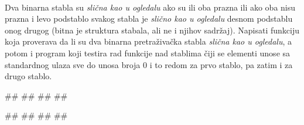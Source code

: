 \begin{Answer}[ref=4_23]
\\
\end{Answer}

\begin{Exercise}[label=4_24, difficulty=1]
Dva binarna stabla su {\em slična kao u ogledalu} ako su ili oba prazna ili ako oba nisu prazna i levo podstablo svakog stabla je {\em slično kao u ogledalu} desnom podstablu onog drugog (bitna je struktura stabala, ali ne i njihov sadržaj). Napisati funkciju koja proverava da li su dva binarna pretraživačka stabla {\em slična kao u ogledalu}, a potom i program koji testira rad funkcije nad stablima čiji se elementi unose sa standardnog ulaza sve do unosa broja $0$ i to redom za prvo stablo, pa zatim i za drugo stablo. 

\begin{miditest}
\begin{upotreba}{1}
#\naslovInt#    
##
##
##
\end{upotreba}
\end{miditest}
\begin{miditest}
\begin{upotreba}{2}
#\naslovInt#    
##
##
##
\end{upotreba}
\end{miditest}
\end{Exercise}

